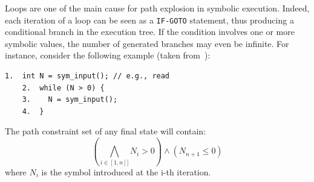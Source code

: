 Loops are one of the main cause for path explosion in symbolic execution. Indeed, each iteration of a loop can be seen as a {\tt IF-GOTO} statement, thus producing a conditional branch in the execution tree. If the condition involves one or more symbolic values, the number of generated branches may even be infinite. For instance, consider the following example (taken from~\cite{CS-CACM13}):
    \begin{lstlisting}[basicstyle=\ttfamily\small]
    1.  int N = sym_input(); // e.g., read
    2.  while (N > 0) {
    3.    N = sym_input();  
    4.  }
    \end{lstlisting}
The path constraint set of any final state will contain:
  \[ \left ( \bigwedge_{i \in [1, n]]} N_i > 0 \right ) \wedge (N_{n+1} \leq 0) \]
where $N_i$ is the symbol introduced at the i-th iteration.\\

